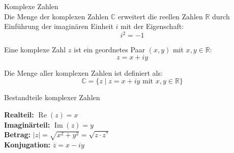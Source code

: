 \begin{concept}{Komplexe Zahlen}\\
Die Menge der komplexen Zahlen $\mathbb{C}$ erweitert die reellen Zahlen $\mathbb{R}$ durch Einführung der imaginären Einheit $i$ mit der Eigenschaft:
$$i^2 = -1$$

Eine komplexe Zahl $z$ ist ein geordnetes Paar $(x,y)$ mit $x,y \in \mathbb{R}$:
$$z = x + iy$$

Die Menge aller komplexen Zahlen ist definiert als:
$$\mathbb{C} = \{z \mid z = x + iy \text{ mit } x,y \in \mathbb{R}\}$$
\end{concept}

\begin{definition}{Bestandteile komplexer Zahlen}\\
\begin{minipage}[t]{0.6\textwidth}
    \vspace{-7mm}
    \textbf{Realteil:} $\operatorname{Re}(z) = x$\\
    \textbf{Imaginärteil:} $\operatorname{Im}(z) = y$\\
    \textbf{Betrag:} $|z| = \sqrt{x^2 + y^2} = \sqrt{z \cdot z^*}$\\
    \textbf{Konjugation:} $\overline{z} = x - iy$
\end{minipage}
\begin{minipage}{0.35\textwidth}
    \vspace{-3mm}
\end{minipage}
\end{definition}

